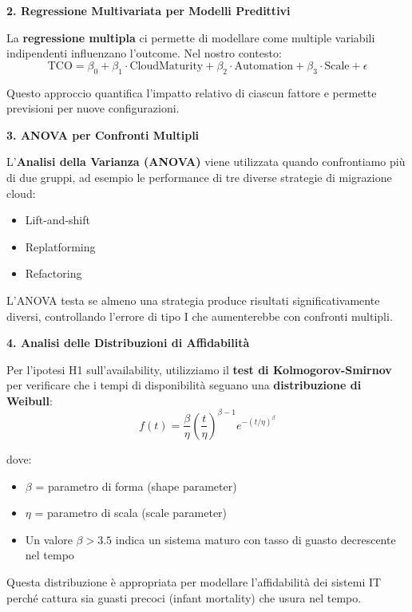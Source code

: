 \textbf{2. Regressione Multivariata per Modelli Predittivi}

La \textbf{regressione multipla} ci permette di modellare come multiple variabili indipendenti influenzano l'outcome. Nel nostro contesto:
\begin{equation}
\text{TCO} = \beta_0 + \beta_1 \cdot \text{CloudMaturity} + \beta_2 \cdot \text{Automation} + \beta_3 \cdot \text{Scale} + \epsilon
\end{equation}

\noindent Questo approccio quantifica l'impatto relativo di ciascun fattore e permette previsioni per nuove configurazioni.

\textbf{3. ANOVA per Confronti Multipli}

L'\textbf{Analisi della Varianza (ANOVA)} viene utilizzata quando confrontiamo più di due gruppi, ad esempio le performance di tre diverse strategie di migrazione cloud:
\begin{itemize}
    \item Lift-and-shift
    \item Replatforming  
    \item Refactoring
\end{itemize}

\noindent L'ANOVA testa se almeno una strategia produce risultati significativamente diversi, controllando l'errore di tipo I che aumenterebbe con confronti multipli.

\textbf{4. Analisi delle Distribuzioni di Affidabilità}

Per l'ipotesi H1 sull'availability, utilizziamo il \textbf{test di Kolmogorov-Smirnov} per verificare che i tempi di disponibilità seguano una \textbf{distribuzione di Weibull}:
\begin{equation}
f(t) = \frac{\beta}{\eta} \left(\frac{t}{\eta}\right)^{\beta-1} e^{-(t/\eta)^\beta}
\end{equation}

\noindent dove:
\begin{itemize}
    \item $\beta$ = parametro di forma (shape parameter)
    \item $\eta$ = parametro di scala (scale parameter)
    \item Un valore $\beta > 3.5$ indica un sistema maturo con tasso di guasto decrescente nel tempo
\end{itemize}

\noindent Questa distribuzione è appropriata per modellare l'affidabilità dei sistemi IT perché cattura sia guasti precoci (infant mortality) che usura nel tempo.

